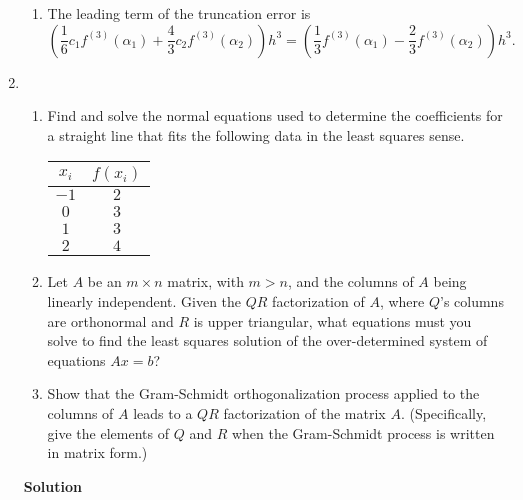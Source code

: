 \documentclass{article}
\begin{document}
\begin{enumerate}
\begin{enumerate}
\item The leading term of the truncation error is
\[\left( \frac{1}{6} c_1 f^{(3)}(\alpha_1) + \frac{4}{3} c_2 f^{(3)}(\alpha_2) \right) h^3
  = \left( \frac{1}{3} f^{(3)}(\alpha_1) - \frac{2}{3} f^{(3)}(\alpha_2) \right) h^3.\]

\end{enumerate}



\item

\begin{enumerate}
\item Find and solve the normal equations used to determine the coefficients for a straight line that fits the following data in the least squares sense.
\begin{center}
\begin{tabular}{c|c}
\(x_i\) & \(f(x_i)\) \\
\hline
\(-1\) & \(2\) \\
\(0\) & \(3\) \\
\(1\) & \(3\) \\
\(2\) & \(4\) \\
\end{tabular}
\end{center}

\item Let \(A\) be an \(m \times n\) matrix, with \(m > n\), and the columns of \(A\) being linearly independent.  Given the \(QR\) factorization of \(A\), where \(Q\)'s columns are orthonormal and \(R\) is upper triangular, what equations must you solve to find the least squares solution of the over-determined system of equations \(Ax = b\)?

\item Show that the Gram-Schmidt orthogonalization process applied to the columns of \(A\) leads to a \(QR\) factorization of the matrix \(A\).  (Specifically, give the elements of \(Q\) and \(R\) when the Gram-Schmidt process is written in matrix form.)

\end{enumerate}

{\bf Solution}


\end{enumerate}
\end{document}
